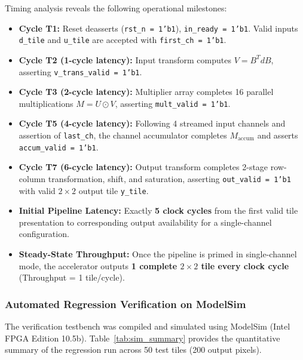 \documentclass[12pt,a4paper]{article}
\begin{document}
Timing analysis reveals the following operational milestones:
\begin{itemize}
    \item \textbf{Cycle T1:} Reset deasserts (\texttt{rst\_n = 1'b1}), \texttt{in\_ready = 1'b1}. Valid inputs \texttt{d\_tile} and \texttt{u\_tile} are accepted with \texttt{first\_ch = 1'b1}.
    \item \textbf{Cycle T2 (1-cycle latency):} Input transform computes $V = B^T d B$, asserting \texttt{v\_trans\_valid = 1'b1}.
    \item \textbf{Cycle T3 (2-cycle latency):} Multiplier array completes 16 parallel multiplications $M = U \odot V$, asserting \texttt{mult\_valid = 1'b1}.
    \item \textbf{Cycle T5 (4-cycle latency):} Following 4 streamed input channels and assertion of \texttt{last\_ch}, the channel accumulator completes $M_{\text{accum}}$ and asserts \texttt{accum\_valid = 1'b1}.
    \item \textbf{Cycle T7 (6-cycle latency):} Output transform completes 2-stage row-column transformation, shift, and saturation, asserting \texttt{out\_valid = 1'b1} with valid $2 \times 2$ output tile \texttt{y\_tile}.
    \item \textbf{Initial Pipeline Latency:} Exactly \textbf{5 clock cycles} from the first valid tile presentation to corresponding output availability for a single-channel configuration.
    \item \textbf{Steady-State Throughput:} Once the pipeline is primed in single-channel mode, the accelerator outputs \textbf{1 complete $2 \times 2$ tile every clock cycle} (Throughput = 1 tile/cycle).
\end{itemize}

\subsubsection{Automated Regression Verification on ModelSim}
The verification testbench was compiled and simulated using ModelSim (Intel FPGA Edition 10.5b). Table~\ref{tab:sim_summary} provides the quantitative summary of the regression run across 50 test tiles (200 output pixels).
\end{document}
